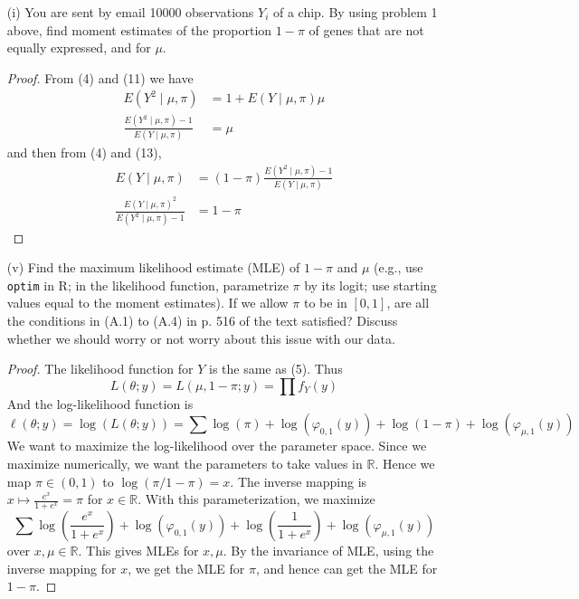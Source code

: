 \documentclass[letterpaper, 12pt]{article}
\newcommand{\R}{\mathbb{R}}
\newcommand{\sbs}{\;|\;} %
\begin{document}
\begin{enumerate}
\begin{enumerate}
\item[(i)]
You are sent by email 10000 observations $Y_i$ of a chip.
By using problem 1 above, find moment estimates of the proportion $1-\pi$ of genes that are not equally expressed, and for $\mu$.
\begin{proof}
From (4) and (11) we have 
\begin{align}
E(Y^2 \sbs \mu, \pi) &= 1 + E(Y \sbs \mu, \pi)\mu \\
\frac{E(Y^2 \sbs \mu, \pi) - 1}{E(Y \sbs \mu, \pi)} &= \mu
\end{align}
and then from (4) and (13), 
\begin{align}
E(Y \sbs \mu, \pi) &= (1 - \pi) 
\frac{E(Y^2 \sbs \mu, \pi) - 1}{E(Y \sbs \mu, \pi)} \\
\frac{E(Y \sbs \mu, \pi)^2}{E(Y^2 \sbs \mu, \pi) - 1} 
&= 1- \pi
\end{align}
\end{proof}
\item[(v)]
Find the maximum likelihood estimate (MLE) of $1 - \pi$ and $\mu$ (e.g., use \texttt{optim} in R; in the likelihood function, parametrize $\pi$ by its logit; use starting values equal to the moment estimates). If we allow $\pi$ to be in $[0,1]$, are all the conditions in (A.1) to (A.4) in p. 516 of the text satisfied? Discuss whether we should worry or not worry about this issue with our data.
\begin{proof}
The likelihood function for $Y$ is the same as (5). Thus
\begin{equation}
L(\theta; y) = L(\mu, 1 - \pi; y) = \prod f_Y(y)
\end{equation}
And the log-likelihood function is
\begin{equation}
\label{lleq}
\ell (\theta; y) = \log (L(\theta;y)) 
= \sum \log(\pi) + \log (\varphi_{0,1}(y)) + \log(1-\pi) + \log (\varphi_{\mu,1}(y))
\end{equation}
We want to maximize the log-likelihood over the parameter space.
Since we maximize numerically, we want the parameters to take values in $\R$. 
Hence we map $\pi \in (0,1)$ to $\log(\pi / 1-\pi) = x$. 
The inverse mapping is $x \mapsto \frac{e^x}{1+e^x} = \pi$ for $x \in \R$.
With this parameterization, we maximize
\begin{equation}
\sum
\log \left(
\frac{e^x}{1+e^x}
\right)
+ 
\log (\varphi_{0,1}(y)) 
+ 
\log \left(
\frac{1}{1+e^x}
\right) 
+ 
\log (\varphi_{\mu,1}(y))
\end{equation}
over $x,\mu \in \R$. This gives MLEs for $x, \mu$. 
By the invariance of MLE, using the inverse mapping for $x$, we get the MLE for $\pi$, and hence can get the MLE for $1-\pi$. 
\end{proof}


\end{enumerate}
\end{enumerate}
\end{document}
